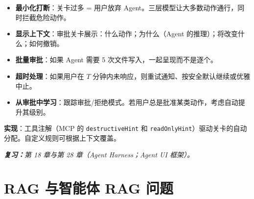 \begin{questionbox}
\begin{itemize}
  \item \textbf{最小化打断}：关卡过多 = 用户放弃 Agent。三层模型让大多数动作通行，同时拦截危险动作。
  \item \textbf{显示上下文}：审批关卡展示：什么动作；为什么（Agent 的推理）；将改变什么；如何撤销。
  \item \textbf{批量审批}：如果 Agent 需要 5 次文件写入，一起呈现而不是逐个。
  \item \textbf{超时处理}：如果用户在 $T$ 分钟内未响应，则重试通知、按安全默认继续或优雅中止。
  \item \textbf{从审批中学习}：跟踪审批/拒绝模式。若用户总是批准某类动作，考虑自动提升其级别。
\end{itemize}

\textbf{实现}：工具注解（MCP 的 \texttt{destructiveHint} 和 \texttt{readOnlyHint}）驱动关卡的自动分配。自定义规则可根据上下文覆盖。

\emph{\textbf{复习：}第 18 章与第 28 章（Agent Harness；Agent UI 框架）。}
\end{questionbox}

\section{RAG 与智能体 RAG 问题}
\label{rag-and-agentic-rag-questions}

